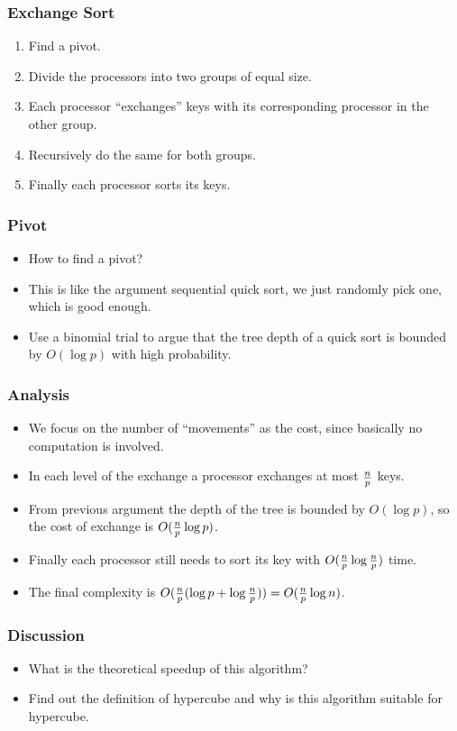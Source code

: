 \documentclass{beamer}
\begin{document}
\begin{CJK}{UTF8}{bsmi}
\begin{frame}
\frametitle{Exchange Sort}
\begin{enumerate}
\item Find a pivot.
\item Divide the processors into two groups of equal size.
\item Each processor ``exchanges'' keys with its corresponding
  processor in the other group.
\item Recursively do the same for both groups.  
\item Finally each processor sorts its keys.
\end{enumerate}
\end{frame}

\begin{frame}
\frametitle{Pivot}
\begin{itemize}
\item How to find a pivot?
\item This is like the argument sequential quick sort, we just
  randomly pick one, which is good enough.
\item Use a binomial trial to argue that the tree depth of a quick
  sort is bounded by $O(\log p)$ with high probability.
\end{itemize}
\end{frame}

\begin{frame}
\frametitle{Analysis}
\begin{itemize}
\item We focus on the number of ``movements'' as the cost, since
  basically no computation is involved.
\item In each level of the exchange a processor exchanges at most ${n
  \over p}$ keys.
\item From previous argument the depth of the tree is bounded by
  $O(\log p)$, so the cost of exchange is $O( {n \over p} \log p)$.
\item Finally each processor still needs to sort its key with $O({n
  \over p} \log {n \over p})$ time.
\item The final complexity is $O({n \over p} (\log p + \log {n \over
  p})) = O({n \over p} \log n)$.
\end{itemize}
\end{frame}

\begin{frame}
\frametitle{Discussion}
\begin{itemize}
\item What is the theoretical speedup of this algorithm?
\item Find out the definition of hypercube and why is this algorithm
  suitable for hypercube.
\end{itemize}
\end{frame}



\end{CJK}
\end{document}
